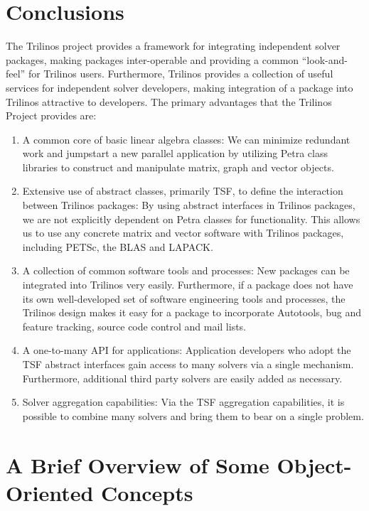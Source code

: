 \documentclass[12pt,relax]{TrilinosOverview}
\begin{document}
\section{Conclusions}

The Trilinos project provides a framework for integrating independent 
solver packages, making packages inter-operable and providing a 
common ``look-and-feel'' 
for Trilinos users.  Furthermore, Trilinos provides a collection 
of useful services for
independent solver developers, making integration of a package into 
Trilinos 
attractive to developers.
The primary advantages that the Trilinos Project provides are:
\begin{enumerate}
\item A common core of basic linear algebra classes:
We can minimize redundant work and jumpstart a new parallel application
by utilizing Petra class libraries to construct 
and manipulate matrix, graph and vector objects.
\item Extensive use of abstract classes, primarily TSF, to define the 
interaction between Trilinos
packages:  By using abstract interfaces in Trilinos packages, we are
not explicitly dependent on Petra classes for functionality.  
This allows us to use any
concrete matrix and vector software with Trilinos packages, 
including PETSc, the BLAS 
and LAPACK.
\item A collection of common software tools and processes: New packages can be 
integrated into Trilinos very easily.  Furthermore, if a package 
does not have its own well-developed set of software engineering tools
and processes, the Trilinos design makes it easy for a package to 
incorporate Autotools, bug and feature tracking,
source code control and mail lists.
\item A one-to-many API for applications: Application developers who 
adopt the TSF abstract interfaces gain access to many solvers via a 
single mechanism.  Furthermore, additional third
party solvers are easily added as necessary.
\item Solver aggregation capabilities:  Via the TSF aggregation 
capabilities, it is possible
to combine many solvers and bring them to bear on a single problem.
\end{enumerate}

\clearpage

%



\appendix
\section{A Brief Overview of Some Object-Oriented Concepts}
\label{sect:OOTutorial}
\end{document}
